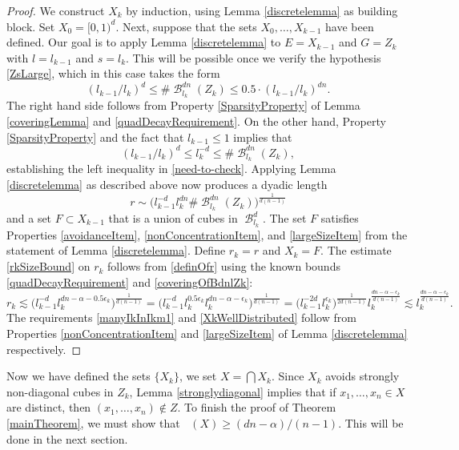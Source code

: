 \documentclass[dvipsnames,letterpaper,12pt]{article}
\numberwithin{equation}{section}
\theoremstyle{plain}
\theoremstyle{remark}
\DeclareMathOperator{\hausdim}{\dim_{\mathbf{H}}}
\DeclareMathOperator{\B}{\mathcal{B}}
\begin{document}
\begin{proof}
	We construct $X_k$ by induction, using Lemma \ref{discretelemma} as building block. Set $X_0=[0,1)^d$. Next, suppose that the sets $X_0, \ldots, X_{k-1}$ have been defined. Our goal is to apply Lemma \ref{discretelemma} to $E = X_{k-1}$ and $G = Z_k$ with $l = l_{k-1}$ and $s = l_k$. This will be possible once we verify the hypothesis \eqref{ZsLarge}, which in this case takes the form
	\begin{equation}
		(l_{k-1}/l_k)^d \leq \#\B_{l_k}^{dn}(Z_k) \leq 0.5 \cdot (l_{k-1}/l_k)^{dn}. \label{need-to-check}
	\end{equation}
	The right hand side follows from Property \ref{SparsityProperty} of Lemma \ref{coveringLemma} and \eqref{quadDecayRequirement}. 
	On the other hand, Property \ref{SparsityProperty} and the fact that $l_{k-1} \leq 1$ implies that
	\[ (l_{k-1}/l_k)^d\leq l_{k}^{-d}\leq \#\B_{l_k}^{dn}(Z_k), \]
	establishing the left inequality in \eqref{need-to-check}. Applying Lemma \ref{discretelemma} as described above now produces a dyadic length
	\begin{equation}\label{definOfr}
		r \sim \big(l_{k-1}^{-d}l_k^{dn} \# \B^{dn}_{l_k}(Z_k)\big)^{\frac{1}{d(n-1)}} 
	\end{equation}
	and a set $F\subset X_{k-1}$ that is a union of cubes in $\B_{l_k}^{d}$. The set $F$ satisfies Properties \ref{avoidanceItem}, \ref{nonConcentrationItem}, and \ref{largeSizeItem} from the statement of Lemma \ref{discretelemma}. Define $r_k=r$ and $X_k=F$. The estimate  \eqref{rkSizeBound} on $r_k$ follows from \eqref{definOfr} using the known bounds \eqref{quadDecayRequirement} and \eqref{coveringOfBdnlZk}:
	\[ r_k \lesssim \bigl( l_{k-1}^{-d}  l_k^{dn -\alpha - 0.5 \epsilon_k} \bigr)^{\frac{1}{d(n-1)}} = \bigl( l_{k-1}^{-d} l_k^{0.5 \epsilon_k} l_k^{dn -\alpha - \epsilon_k} \bigr)^{\frac{1}{d(n-1)}} = \bigl( l_{k-1}^{-2d} l_k^{\epsilon_k}\bigr)^{\frac{1}{2d(n-1)}} l_{k}^{\frac{dn-\alpha -\epsilon_k}{d(n-1)}} \lesssim l_{k}^{\frac{dn-\alpha -\epsilon_k}{d(n-1)}}. \]
	The requirements \eqref{manyIkInIkm1} and \eqref{XkWellDistributed} follow from Properties \ref{nonConcentrationItem} and \ref{largeSizeItem} of Lemma \ref{discretelemma} respectively.
\end{proof} 

Now we have defined the sets $\{ X_k \}$, we set $X = \bigcap X_k$. Since $X_k$ avoids strongly non-diagonal cubes in $Z_k$, Lemma \ref{stronglydiagonal} implies that if $x_1, \dots, x_n \in X$ are distinct, then $(x_1, \dots, x_n) \not \in Z$. To finish the proof of Theorem \ref{mainTheorem}, we must show that $\hausdim(X) \geq (dn - \alpha)/(n - 1)$. This will be done in the next section. 
\end{document}
